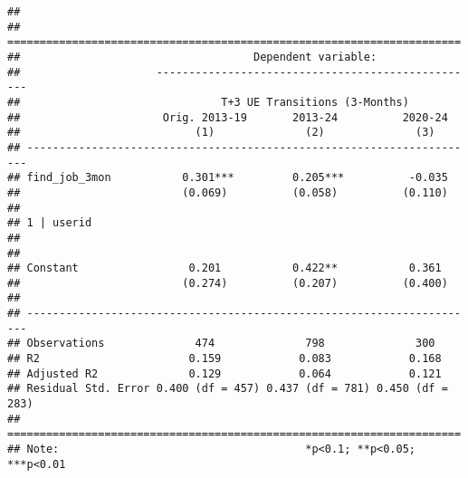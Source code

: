 \begin{verbatim}
## 
## ======================================================================
##                                    Dependent variable:                
##                     --------------------------------------------------
##                               T+3 UE Transitions (3-Months)           
##                      Orig. 2013-19       2013-24          2020-24     
##                           (1)              (2)              (3)       
## ----------------------------------------------------------------------
## find_job_3mon           0.301***         0.205***          -0.035     
##                         (0.069)          (0.058)          (0.110)     
##                                                                       
## 1 | userid                                                            
##                                                                       
##                                                                       
## Constant                 0.201           0.422**           0.361      
##                         (0.274)          (0.207)          (0.400)     
##                                                                       
## ----------------------------------------------------------------------
## Observations              474              798              300       
## R2                       0.159            0.083            0.168      
## Adjusted R2              0.129            0.064            0.121      
## Residual Std. Error 0.400 (df = 457) 0.437 (df = 781) 0.450 (df = 283)
## ======================================================================
## Note:                                      *p<0.1; **p<0.05; ***p<0.01
\end{verbatim}


